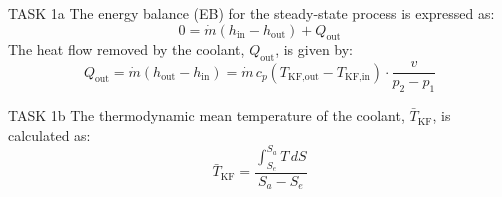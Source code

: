 TASK 1a  
The energy balance (EB) for the steady-state process is expressed as:  
\[
0 = \dot{m} \left( h_{\text{in}} - h_{\text{out}} \right) + Q_{\text{out}}
\]  
The heat flow removed by the coolant, \( Q_{\text{out}} \), is given by:  
\[
Q_{\text{out}} = \dot{m} \left( h_{\text{out}} - h_{\text{in}} \right) = \dot{m} \, c_{p} \left( T_{\text{KF,out}} - T_{\text{KF,in}} \right) \cdot \frac{v}{p_2 - p_1}
\]  

TASK 1b  
The thermodynamic mean temperature of the coolant, \( \bar{T}_{\text{KF}} \), is calculated as:  
\[
\bar{T}_{\text{KF}} = \frac{\int_{S_e}^{S_a} T \, dS}{S_a - S_e}
\]  